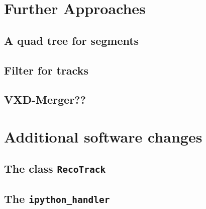 \section{Further Approaches}
\subsection{A quad tree for segments}
\subsection{Filter for tracks}
\subsection{VXD-Merger??}

\section{Additional software changes}
\subsection{The class \texttt{RecoTrack}}
\subsection{The \texttt{ipython\_handler}}
